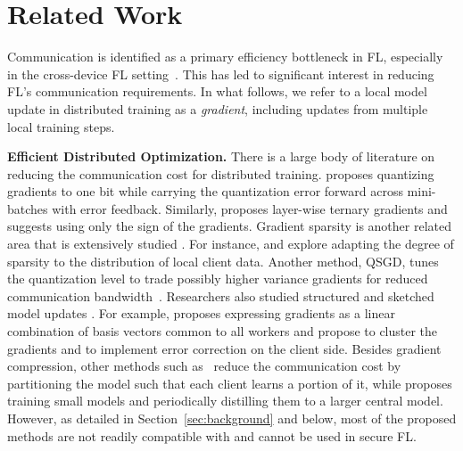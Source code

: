 \newcommand{\para}[1]{\noindent \textbf{#1}}

\section{Related Work}
\label{sec:related}

Communication is identified as a primary efficiency bottleneck in FL, especially in the cross-device FL setting~\citep{kairouz2019advances}. 
This has led to significant interest in reducing FL's communication requirements. In what follows, we refer to a local model update in distributed training as a \emph{gradient}, including updates from multiple local training steps.

\para{Efficient Distributed Optimization.} There is a large body of literature on reducing the communication cost for distributed training. \cite{seide2014bit} proposes quantizing gradients to one bit while carrying the quantization error forward across mini-batches with error feedback. Similarly, \cite{wen2017terngrad} proposes layer-wise ternary gradients and \cite{bernstein2018signsgd} suggests using only the sign of the gradients. Gradient sparsity is another related area that is extensively studied \citep{wangni2017gradient,aji2017sparse,lin2017deep,renggli2018sparcml,parcollet2022zerofl}. 
For instance, \cite{chen2017adacomp} and \cite{han2020adaptive} explore adapting the degree of sparsity to the distribution of local client data. Another method, QSGD, tunes the quantization level to trade possibly higher variance gradients for reduced communication bandwidth~\citep{alistarh2016qsgd}. Researchers also studied structured and sketched model updates \citep{konen2016federated}. 
For example, \cite{wang2018atomo} proposes expressing gradients as a linear combination of basis vectors common to all workers and \cite{wang2022fedlite} propose to cluster the gradients and to implement error correction on the client side. Besides gradient compression, other methods such as~\cite{vepakomma2018split,hu2019dynamic} reduce the communication cost by partitioning the model such that each client learns a portion of it, while \cite{he2020group} proposes training small models and periodically distilling them to a larger central model. However, as detailed in Section~\ref{sec:background} and below, most of the proposed methods are not readily compatible with \SecAgg and cannot be used in secure FL.

